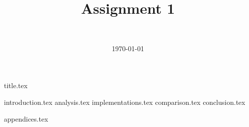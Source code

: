\documentclass[final]{article}
\title{Assignment 1}
\author{~}
\date{\today}
\begin{document}

{title.tex}
\newpage

{introduction.tex}
{analysis.tex}
{implementations.tex}
{comparison.tex}
{conclusion.tex}
\newpage
{}

\printbibliography
{appendices.tex}
\end{document}
